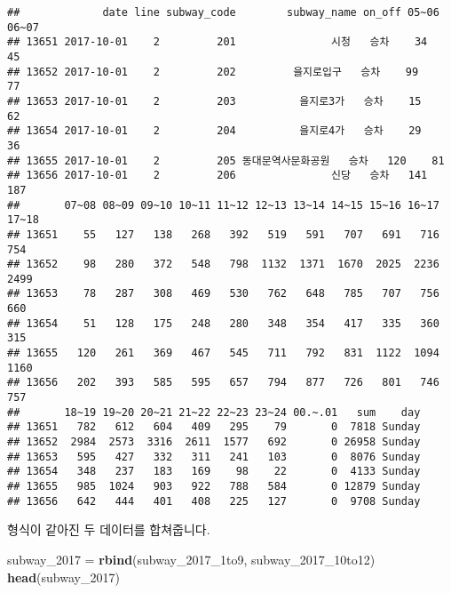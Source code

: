 \documentclass[]{article}
\newenvironment{Shaded}{\begin{snugshade}}{\end{snugshade}}
\newcommand{\KeywordTok}[1]{\textcolor[rgb]{0.13,0.29,0.53}{\textbf{#1}}}
\newcommand{\DecValTok}[1]{\textcolor[rgb]{0.00,0.00,0.81}{#1}}
\newcommand{\StringTok}[1]{\textcolor[rgb]{0.31,0.60,0.02}{#1}}
\newcommand{\OperatorTok}[1]{\textcolor[rgb]{0.81,0.36,0.00}{\textbf{#1}}}
\newcommand{\NormalTok}[1]{#1}
\begin{document}
\begin{Shaded}
\end{Shaded}

\begin{verbatim}
##             date line subway_code        subway_name on_off 05~06 06~07
## 13651 2017-10-01    2         201               시청   승차    34    45
## 13652 2017-10-01    2         202         을지로입구   승차    99    77
## 13653 2017-10-01    2         203          을지로3가   승차    15    62
## 13654 2017-10-01    2         204          을지로4가   승차    29    36
## 13655 2017-10-01    2         205 동대문역사문화공원   승차   120    81
## 13656 2017-10-01    2         206               신당   승차   141   187
##       07~08 08~09 09~10 10~11 11~12 12~13 13~14 14~15 15~16 16~17 17~18
## 13651    55   127   138   268   392   519   591   707   691   716   754
## 13652    98   280   372   548   798  1132  1371  1670  2025  2236  2499
## 13653    78   287   308   469   530   762   648   785   707   756   660
## 13654    51   128   175   248   280   348   354   417   335   360   315
## 13655   120   261   369   467   545   711   792   831  1122  1094  1160
## 13656   202   393   585   595   657   794   877   726   801   746   757
##       18~19 19~20 20~21 21~22 22~23 23~24 00.~.01   sum    day
## 13651   782   612   604   409   295    79       0  7818 Sunday
## 13652  2984  2573  3316  2611  1577   692       0 26958 Sunday
## 13653   595   427   332   311   241   103       0  8076 Sunday
## 13654   348   237   183   169    98    22       0  4133 Sunday
## 13655   985  1024   903   922   788   584       0 12879 Sunday
## 13656   642   444   401   408   225   127       0  9708 Sunday
\end{verbatim}

형식이 같아진 두 데이터를 합쳐줍니다.

\begin{Shaded}
\begin{Highlighting}[]
\NormalTok{subway_}\DecValTok{2017}\NormalTok{ =}\StringTok{ }\KeywordTok{rbind}\NormalTok{(subway_2017_1to9, subway_2017_10to12)}
\KeywordTok{head}\NormalTok{(subway_}\DecValTok{2017}\NormalTok{)}
\end{Highlighting}
\end{Shaded}
\end{document}
